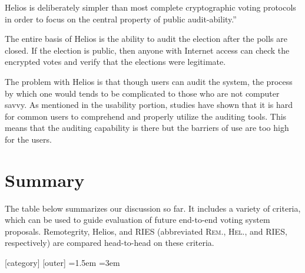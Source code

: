 Helios is deliberately simpler than most complete cryptographic voting protocols in order to focus on the central property of public audit-ability.''~\cite{adida2008}

The entire basis of Helios is the ability to audit the election after the polls are closed. If the election is public, then anyone with Internet access can check the encrypted votes and verify that the elections were legitimate.

The problem with Helios is that though users can audit the system, the process by which one would tends to be complicated to those who are not computer savvy. As mentioned in the usability portion, studies have shown that it is hard for common users to comprehend and properly utilize the auditing tools. This means that the auditing capability is there but the barriers of use are too high for the users.

\section{Summary}

The table below summarizes our discussion so far. It includes a variety of criteria, which can be used to guide evaluation of future end-to-end voting system proposals. Remotegrity, Helios, and RIES (abbreviated \textsc{Rem.}, \textsc{Hel.}, and \textsc{RIES}, respectively) are compared head-to-head on these criteria.


[category]
[outer]
\newlength\outermargin\outermargin=1.5em
\newlength\innermargin\innermargin=3em
\newcommand\category{\stepcounter{category}}
\newcommand\outeritem{%
  \hangindent=\outermargin%
  \hangafter=1%
  \makebox[\outermargin][r]{%
    \stepcounter{outer}\arabic{outer}.\hspace{\labelsep}%
  }%
}
\newcommand\inneritem{%
  \setlength{\hangindent}{\innermargin}%
  \makebox[\innermargin][r]{%
    \stepcounter{inner}\alph{inner})\hspace{\labelsep}%
  }%
}

\newcommand\yes{Yes}
\newcommand\unclear{Unclear}
\newcommand\no{No}
\newcommand\notapplicable{N/A}
\newcommand\good{\cellcolor{accessiblegreen}}
\newcommand\neutral{}
\newcommand\bad{\cellcolor{accessiblered}}

